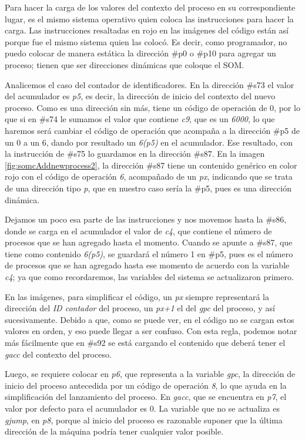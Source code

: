 \documentclass[letterpaper,12pt,oneside]{book}
\begin{document}
			Para hacer la carga de los valores del contexto del proceso en su correspondiente lugar, es el mismo sistema operativo
			quien coloca las instrucciones para hacer la carga. Las instrucciones resaltadas en rojo en las imágenes del código 
			están así porque fue el mismo sistema quien las colocó. Es decir, como programador, no puedo colocar de manera estática la dirección
			\#p0 o \#p10 para agregar un proceso; tienen que ser direcciones dinámicas que coloque el SOM.
   
            Analicemos el caso del contador de identificadores. En la dirección
			\#s73 el valor del acumulador es \textit{p5}, es decir, la dirección de inicio del contexto del nuevo proceso. Como es una dirección sin 
			más,
			tiene un código de operación de 0, por lo que si en \#s74 le sumamos el valor que contiene \textit{c9}, que es un \textit{6000}, lo que 
			haremos
			será cambiar el código de operación que acompaña a la dirección \#p5 de un 0 a un 6, dando por resultado un \textit{6(p5)} en el 
			acumulador.
			Ese resultado, con la instrucción de \#s75 lo guardamos en la dirección \#s87. En la imagen \ref{fig:somcAddnewprocess2}, 
			la dirección \#s87 tiene 
			un contenido genérico en color rojo con el código de operación \textit{6}, acompañado de un \textit{px}, indicando
			que se trata de una dirección tipo \textit{p}, que en nuestro caso sería la \#p5, pues es una dirección dinámica. 

			Dejamos un poco esa parte de las instrucciones y nos movemos hasta la \#s86, donde se carga
			en el acumulador el valor de \textit{c4}, que contiene el número de procesos que se han agregado hasta el momento. Cuando se apunte a \#s87,
			que tiene como contenido \textit{6(p5)}, se guardará el número 1 en \#p5, pues es el número de procesos que se han agregado hasta ese 
			momento de acuerdo con la variable \textit{c4}; ya que como recordaremos, las variables del sistema se actualizaron primero.
			
			En las imágenes, para simplificar el código, un \textit{px} siempre representará la dirección del \textit{ID contador} del proceso, un
			\textit{px+1} el del \textit{gpc} del proceso, y así sucesivamente. Debido a que, como se puede ver, en el código no se cargan estos valores 
			en orden,
			y eso puede llegar a ser confuso. Con esta regla, podemos notar más fácilmente que en \#s92 se está cargando el contenido que deberá tener
			el \textit{gacc} del contexto del proceso.	
			
			Luego, se requiere colocar en \textit{p6}, que representa a la variable \textit{gpc}, la dirección
			de inicio del proceso antecedida por un código de operación \textit{8}, lo que ayuda en la simplificación del lanzamiento del proceso.
			En \textit{gacc}, que se encuentra en \textit{p7}, el valor por defecto para el acumulador es 0. La variable que
			no se actualiza es \textit{gjump}, en \textit{p8}, porque al inicio del proceso es razonable suponer que la última dirección de la máquina
			podría tener cualquier valor posible.
            
\end{document}
